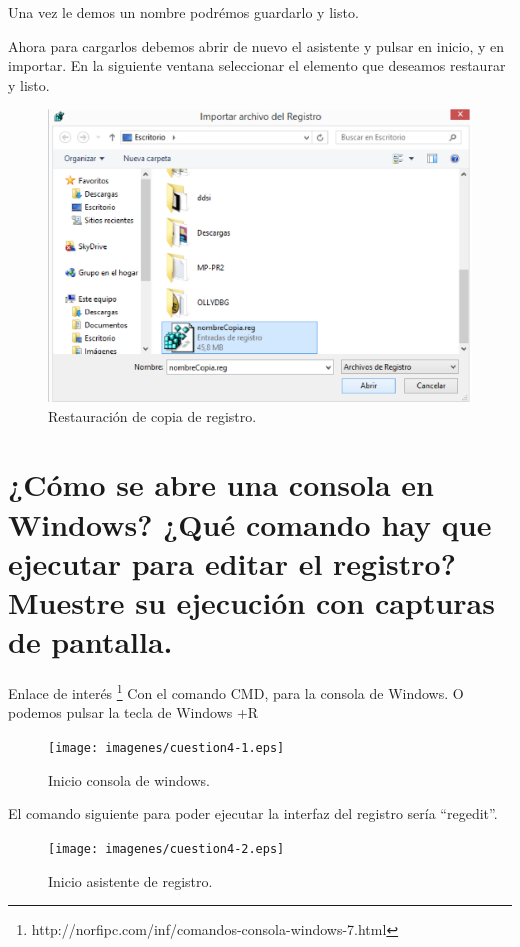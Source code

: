 Una vez le demos un nombre podrémos guardarlo y listo.

Ahora para cargarlos debemos abrir de nuevo el asistente y pulsar en inicio, y en importar. En la siguiente ventana seleccionar el elemento que deseamos restaurar y listo.
\begin{figure}[H]
\begin{center}
\includegraphics[scale=0.8]{imagenes/cuestion3-3.eps}
\caption{Restauración de copia de registro.}
\end{center}
\end{figure}

\section{¿Cómo se abre una consola en Windows? ¿Qué comando hay que ejecutar para editar el registro? Muestre su ejecución con capturas de pantalla.}
Enlace de interés \footnote{http://norfipc.com/inf/comandos-consola-windows-7.html}
Con el comando CMD, para la consola de Windows. O podemos pulsar la tecla de Windows +R
\begin{figure}[H]
\begin{center}
\texttt{[image: imagenes/cuestion4-1.eps]}
\caption{Inicio consola de windows.}
\end{center}
\end{figure}


El comando siguiente para poder ejecutar la interfaz del registro sería “regedit”.
\begin{figure}[H]
\begin{center}
\texttt{[image: imagenes/cuestion4-2.eps]}
\caption{Inicio asistente de registro.}
\end{center}
\end{figure} 

